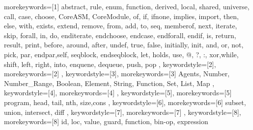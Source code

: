 {	 morekeywords=[1]{
	 abstract, rule, enum, function, derived, local, shared, universe, call, case, choose, CoreASM, CoreModule, of, if, ifnone, implies, import, then, else, with, exists, extend, remove, from, add, to, seq, memberof, next, iterate, skip, forall, in, do, enditerate, endchoose, endcase, endforall, endif, is, return, result, print, before, around, after, undef, true, false, initially, init, and, or, not, pick, par, endpar,self, seqblock, endseqblock, let, holds, use, @, ?, :, xor,while, shift, left, right, into, enquene, dequeue, push, pop
	 }, 
	 keywordstyle=[2]{\asmlstrule}, %
	 morekeywords=[2]{
	 }, 
	 keywordstyle=[3]{\asmlstdomain}, %
	 morekeywords=[3]{
	 	Agents, Number, Number_Range, Boolean, Element, String, Function, Set, List, Map
	 },
	 keywordstyle=[4]{\asmlstpredicate},%
	 morekeywords=[4]{
	 },
	 keywordstyle=[5]{\asmlstfunction}, %
	 morekeywords=[5]{
		program, head, tail, nth, size,cons
	 },
	 keywordstyle=[6]{\asmlstderived}, %
	 morekeywords=[6]{
	 subset, union, intersect, diff
	 },
	 keywordstyle=[7]{\asmlstvariable}, %
	 morekeywords=[7]{
	 },
	 keywordstyle=[8]{\asmlstconstant}, %
	 morekeywords=[8]{
	 id, loc, value, guard, function, bin-op, expression
	 }
}
\newcommand{\AsmKeyword}[1]{\lstset{morekeywords=[1]{#1}}}
\newcommand{\AsmRule}[1]{\lstset{morekeywords=[2]{#1}}}
\newcommand{\AsmDomain}[1]{\lstset{morekeywords=[3]{#1}}}
\newcommand{\AsmPredicate}[1]{\lstset{morekeywords=[4]{#1}}}
\newcommand{\AsmFunction}[1]{\lstset{morekeywords=[5]{#1}}}
\newcommand{\AsmDerivedFunction}[1]{\lstset{morekeywords=[6]{#1}}}
\newcommand{\AsmVariable}[1]{\lstset{morekeywords=[7]{#1}}}
\newcommand{\AsmConstantOrEnum}[1]{\lstset{morekeywords=[8]{#1}}}

\newcommand{\asmboxed}[1]{\fontsize{7}{8.4}\ensuremath{\boxed{\hspace{-.175em}#1\hspace{-.175em}}}}